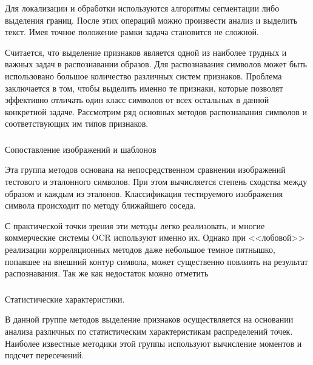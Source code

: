 Для локализации и обработки используются алгоритмы сегментации либо выделения границ. После этих операций можно произвести анализ и выделить текст. Имея точное положение рамки задача становится не сложной.

Считается, что выделение признаков является одной из наиболее трудных и важных задач в распознавании образов. Для распознавания символов может быть использовано большое количество различных систем признаков. Проблема заключается в том, чтобы выделить именно те признаки, которые позволят эффективно отличать один класс символов от всех остальных в данной конкретной задаче.
Рассмотрим ряд основных методов распознавания символов и соответствующих им типов признаков.

\subsubsection{}
\label{sub:domain:recognition:compare_with_template}
Сопоставление изображений и шаблонов

Эта группа методов основана на непосредственном сравнении изображений тестового и эталонного символов. При этом вычисляется степень сходства между образом и каждым из эталонов. Классификация тестируемого изображения символа происходит по методу ближайшего соседа. 

С практической точки зрения эти методы легко реализовать, и многие коммерческие системы OCR используют именно их. Однако при <<лобовой>> реализации корреляционных методов даже небольшое темное пятнышко, попавшее на внешний контур символа, может существенно повлиять на результат распознавания. Так же как недостаток можно отметить

\subsubsection{}
\label{sub:domain:recognition:statistic_analisys}
Статистические характеристики.

В данной группе методов выделение признаков осуществляется на основании анализа различных по статистическим характеристикам распределений точек. Наиболее известные методики этой группы используют вычисление моментов и подсчет пересечений.

